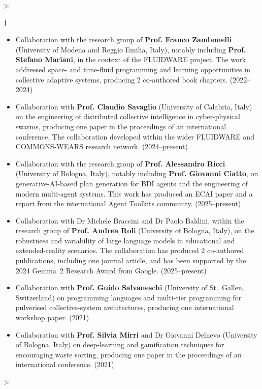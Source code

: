 \documentclass[10pt,a4paper,roman]{moderncv}        %
\makeatletter
\newenvironment{cvprose}%
  {\begin{list}{}{%
     \setlength{\leftmargin}{\dimexpr\hintscolumnwidth+\separatorcolumnwidth\relax}%
     \setlength{\rightmargin}{0pt}%
     \setlength{\listparindent}{0pt}%
     \setlength{\itemindent}{0pt}%
     \setlength{\labelwidth}{0pt}%
     \setlength{\topsep}{.25em}%
     \setlength{\parsep}{.5em}%
     \setlength{\partopsep}{0pt}}%
   \item\relax}%
  {\end{list}}
\newenvironment{cvlist}[1][2]%
  {\begin{cvprose}%
   \cvlist@cols=#1\relax
   \setlength{\multicolsep}{0pt}%
   \setlength{\columnsep}{1.2em}%
   \setlength{\columnwidth}{\linewidth}%
   \ifnum\cvlist@cols>\@ne\begin{multicols}{#1}\fi
   \begin{itemize}%
     \setlength{\itemsep}{.1ex}%
     \setlength{\parskip}{0pt}%
     \setlength{\topsep}{0pt}}%
  {\end{itemize}%
   \ifnum\cvlist@cols>\@ne\end{multicols}\fi
   \end{cvprose}}
\makeatother
\begin{document}
\begin{cvlist}[1]
  \item Collaboration with the research group of \textbf{Prof. Franco Zambonelli} (University of Modena and Reggio Emilia, Italy), notably including \textbf{Prof. Stefano Mariani}, in the context of the FLUIDWARE project. The work addressed space- and time-fluid programming and learning opportunities in collective adaptive systems, producing 2 co-authored book chapters. (2022--2024)
  \item Collaboration with \textbf{Prof. Claudio Savaglio} (University of Calabria, Italy) on the engineering of distributed collective intelligence in cyber-physical swarms, producing one paper in the proceedings of an international conference. The collaboration developed within the wider FLUIDWARE and COMMONS-WEARS research network. (2024--present)
  \item Collaboration with the research group of \textbf{Prof. Alessandro Ricci} (University of Bologna, Italy), notably including \textbf{Prof. Giovanni Ciatto}, on generative-AI-based plan generation for BDI agents and the engineering of modern multi-agent systems. This work has produced an ECAI paper and a report from the international Agent Toolkits community. (2025--present)
  \item Collaboration with Dr Michele Braccini and Dr Paolo Baldini, within the research group of \textbf{Prof. Andrea Roli} (University of Bologna, Italy), on the robustness and variability of large language models in educational and extended-reality scenarios. The collaboration has produced 2 co-authored publications, including one journal article, and has been supported by the 2024 Gemma~2 Research Award from Google. (2025--present)
  \item Collaboration with \textbf{Prof. Guido Salvaneschi} (University of St.~Gallen, Switzerland) on programming languages and multi-tier programming for pulverised collective-system architectures, producing one international workshop paper. (2021)
  \item Collaboration with \textbf{Prof. Silvia Mirri} and Dr Giovanni Delnevo (University of Bologna, Italy) on deep-learning and gamification techniques for encouraging waste sorting, producing one paper in the proceedings of an international conference. (2021)
\end{cvlist}
\end{document}
